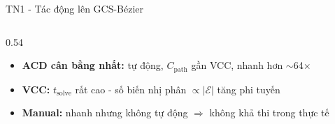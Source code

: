 \documentclass[aspectratio=169]{beamer}
\begin{document}
\begin{frame}{TN1 - Tác động lên GCS-Bézier}
\begin{columns}[T,onlytextwidth]
\begin{column}{0.54\textwidth}
            \vspace{-0.2em}
            {\footnotesize
                \begin{itemize}
                    \item \textbf{ACD cân bằng nhất:} tự động, $C_{\text{path}}$ gần VCC, nhanh hơn $\sim$64$\times$
                    \item \textbf{VCC:} $t_{\text{solve}}$ rất cao - số biến nhị phân $\propto|\mathcal{E}|$ tăng phi tuyến
                    \item \textbf{Manual:} nhanh nhưng không tự động $\Rightarrow$ không khả thi trong thực tế
                \end{itemize}
            }
        \end{column}
    \end{columns}
\end{frame}
\end{document}
